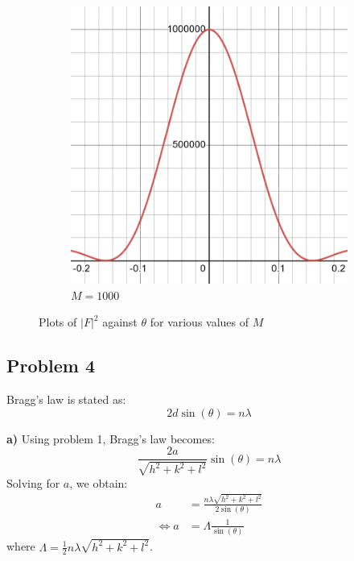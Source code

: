 \documentclass[12pt]{article}
\begin{document}
\begin{figure}[!ht]
    \begin{subfigure}[c]{0.5\textwidth}
        \centering
        \includegraphics[width=\textwidth]{2_XRD/Graphics/Exercises/M=1000.png}
        \caption{$M=1000$}
        \label{fig:subM1000}
    \end{subfigure}
    \label{fig:plotF*F}
    \caption{Plots of $|F|^2$ against $\theta$ for various values of $M$}
\end{figure}
\FloatBarrier

\subsection{Problem 4}
Bragg's law is stated as: 
\begin{equation}
    2d\sin(\theta) = n\lambda
\end{equation}

\textbf{a)} Using problem 1, Bragg's law becomes:
\begin{equation}
    \frac{2a}{\sqrt{h^2+k^2+l^2}} \sin(\theta) = n\lambda
\end{equation}
Solving for $a$, we obtain:
\begin{align}
    a &= \frac{n\lambda \sqrt{h^2+k^2+l^2}}{2\sin(\theta)} \\ 
    \Leftrightarrow a &= \Lambda\frac{1}{\sin(\theta)}
\end{align}
where $\Lambda = \frac{1}{2} n\lambda \sqrt{h^2+k^2+l^2}$.
\end{document}
